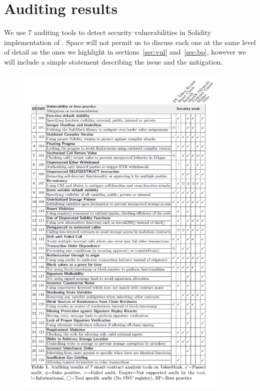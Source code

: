
%
%
%

\section{Auditing results}\label{subsec:audits}
We use 7 auditing tools to detect security vulnerabilities in Solidity implementation of \sys. Space will not permit us to discuss each one at the same level of detail as the ones we highlight in sections~\ref{sec:vul} and~\ref{sec:bp}, however we will include a simple statement describing the issue and the mitigation.

\begin{figure}[t!]
	\centering
	\includegraphics[width=0.9\textwidth]{figures/table1.png}
\end{figure}

